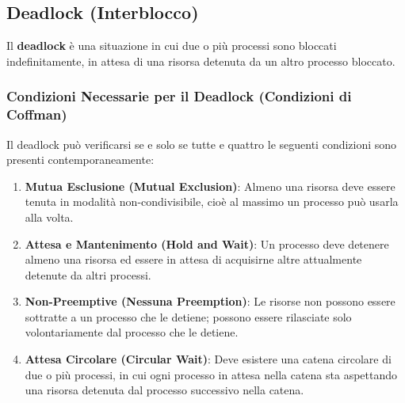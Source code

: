 \subsection{Deadlock (Interblocco)}
Il \textbf{deadlock} è una situazione in cui due o più processi sono bloccati indefinitamente, in attesa di una risorsa detenuta da un altro processo bloccato.

\subsubsection{Condizioni Necessarie per il Deadlock (Condizioni di Coffman)}
Il deadlock può verificarsi se e solo se tutte e quattro le seguenti condizioni sono presenti contemporaneamente:
\begin{enumerate}
    \item \textbf{Mutua Esclusione (Mutual Exclusion)}: Almeno una risorsa deve essere tenuta in modalità non-condivisibile, cioè al massimo un processo può usarla alla volta.
    \item \textbf{Attesa e Mantenimento (Hold and Wait)}: Un processo deve detenere almeno una risorsa ed essere in attesa di acquisirne altre attualmente detenute da altri processi.
    \item \textbf{Non-Preemptive (Nessuna Preemption)}: Le risorse non possono essere sottratte a un processo che le detiene; possono essere rilasciate solo volontariamente dal processo che le detiene.
    \item \textbf{Attesa Circolare (Circular Wait)}: Deve esistere una catena circolare di due o più processi, in cui ogni processo in attesa nella catena sta aspettando una risorsa detenuta dal processo successivo nella catena.
\end{enumerate}

